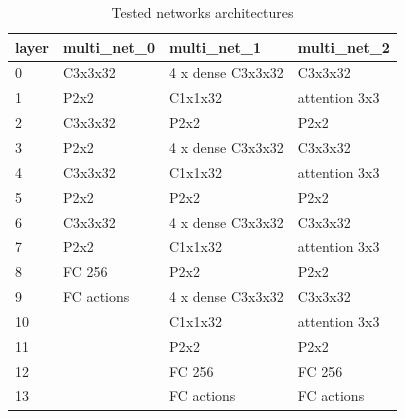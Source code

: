 \documentclass[10pt,a4paper]{article}
\begin{document}
\begin{table}[htb!]
\centering
\begin{tabular}{|l|l|l|l|}
\hline
\textbf{layer} & \textbf{multi\_net\_0}             & \textbf{multi\_net\_1}                    & \textbf{multi\_net\_2}                \\ \hline
0              & \cellcolor[HTML]{CBCEFB}C3x3x32    & \cellcolor[HTML]{FFCCC9}4 x dense C3x3x32 & \cellcolor[HTML]{CBCEFB}C3x3x32       \\ \hline
1              & \cellcolor[HTML]{9AFF99}P2x2       & \cellcolor[HTML]{CBCEFB}C1x1x32           & \cellcolor[HTML]{6AFFFA}attention 3x3 \\ \hline
2              & \cellcolor[HTML]{CBCEFB}C3x3x32    & \cellcolor[HTML]{9AFF99}P2x2              & \cellcolor[HTML]{9AFF99}P2x2          \\ \hline
3              & \cellcolor[HTML]{9AFF99}P2x2       & \cellcolor[HTML]{FFCCC9}4 x dense C3x3x32 & \cellcolor[HTML]{CBCEFB}C3x3x32       \\ \hline
4              & \cellcolor[HTML]{CBCEFB}C3x3x32    & \cellcolor[HTML]{CBCEFB}C1x1x32           & \cellcolor[HTML]{6AFFFA}attention 3x3 \\ \hline
5              & \cellcolor[HTML]{9AFF99}P2x2       & \cellcolor[HTML]{9AFF99}P2x2              & \cellcolor[HTML]{9AFF99}P2x2          \\ \hline
6              & \cellcolor[HTML]{CBCEFB}C3x3x32    & \cellcolor[HTML]{FFCCC9}4 x dense C3x3x32 & \cellcolor[HTML]{CBCEFB}C3x3x32       \\ \hline
7              & \cellcolor[HTML]{9AFF99}P2x2       & \cellcolor[HTML]{CBCEFB}C1x1x32           & \cellcolor[HTML]{6AFFFA}attention 3x3 \\ \hline
8              & \cellcolor[HTML]{FFFC9E}FC 256     & \cellcolor[HTML]{9AFF99}P2x2              & \cellcolor[HTML]{9AFF99}P2x2          \\ \hline
9              & \cellcolor[HTML]{FFFC9E}FC actions & \cellcolor[HTML]{FFCCC9}4 x dense C3x3x32 & \cellcolor[HTML]{CBCEFB}C3x3x32       \\ \hline
10             &                                    & \cellcolor[HTML]{CBCEFB}C1x1x32           & \cellcolor[HTML]{6AFFFA}attention 3x3 \\ \hline
11             &                                    & \cellcolor[HTML]{9AFF99}P2x2              & \cellcolor[HTML]{9AFF99}P2x2          \\ \hline
12             &                                    & \cellcolor[HTML]{FFFC9E}FC 256            & \cellcolor[HTML]{FFFC9E}FC 256        \\ \hline
13             &                                    & \cellcolor[HTML]{FFFC9E}FC actions        & \cellcolor[HTML]{FFFC9E}FC actions    \\ \hline
\end{tabular}
\caption{Tested networks architectures}
\label{tab:networks}
\end{table}
\end{document}
